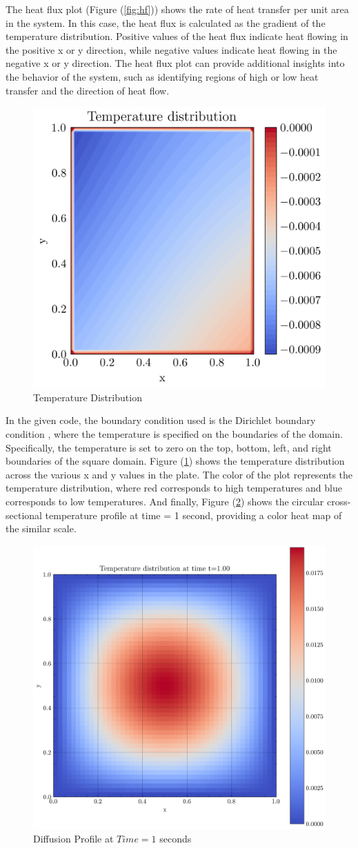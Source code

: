 The heat flux plot (Figure (\ref{fig:hf})) shows the rate of heat transfer per unit area in the system. In this case, the heat flux is calculated as the gradient of the temperature distribution. Positive values of the heat flux indicate heat flowing in the positive x or y direction, while negative values indicate heat flowing in the negative x or y direction. The heat flux plot can provide additional insights into the behavior of the system, such as identifying regions of high or low heat transfer and the direction of heat flow.

\begin{figure}[htb!]
\begin{center}
\includegraphics[width=.49\textwidth]{images/temp_dist.png}
\vspace*{-8mm}
\caption{Temperature Distribution}
\label{fig:tmd}
\end{center}
\end{figure}

In the given code, the boundary condition used is the Dirichlet boundary condition \cite{Srivastava_2022}, where the temperature is specified on the boundaries of the domain. Specifically, the temperature is set to zero on the top, bottom, left, and right boundaries of the square domain. Figure (\ref{fig:tmd}) shows the temperature distribution across the various x and y values in the plate. The color of the plot represents the temperature distribution, where red corresponds to high temperatures and blue corresponds to low temperatures. And finally, Figure (\ref{fig:t01}) shows the circular cross-sectional temperature profile at time = 1 second, providing a color heat map of the similar scale.  

\begin{figure}[htb!]
\begin{center}
\includegraphics[width=.49\textwidth]{images/teemp_dist_time.png}
\vspace*{-8mm}
\caption{Diffusion Profile at $Time = 1$ seconds}
\label{fig:t01}
\end{center}
\end{figure}

